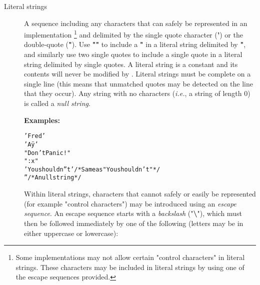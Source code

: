 \begin{description}
\item[Literal strings]\label{refxstr}
\index{,}
\index{,}

A sequence including any characters that can safely be represented in
an implementation
\footnote{
Some implementations may not allow certain "control characters"
in literal strings.
These characters may be included in literal strings by using one of the
escape sequences provided.
}
and delimited by the single quote character (\textbf{'}) or the
double-quote (\textbf{"}).
Use \textbf{""} to include a \textbf{"} in a literal
string delimited by \textbf{"}, and similarly use two single
quotes to include a single quote in a literal string delimited by
single quotes.
A literal string is a constant and its contents will never be modified
by \nr{}.
Literal strings must be complete on a single line (this means that
unmatched quotes may be detected on the line that they occur).
 Any string with no characters (\emph{i.e.}, a string of length 0) is called
a \emph{null string}.
 
\textbf{Examples:}
\begin{alltt}
'Fred'
'Aÿ'
"Don't Panic!"
":x"
'You shouldn''t'    /* Same as "You shouldn't" */
''                  /* A null string */
\end{alltt}
 
Within literal strings, characters that cannot safely or easily be
represented (for example "control characters") may be introduced
using an \emph{escape sequence}.  An escape sequence starts with a
\emph{backslash} ("\textbf{\textbackslash }"), which must then be
followed immediately by one of the following (letters may be in either
uppercase or lowercase):


\end{description}

